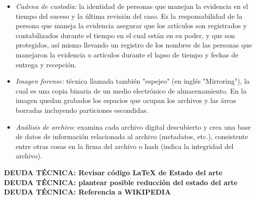 \begin{itemize}
    \item \emph{Cadena de custodia:} la identidad de personas que manejan la evidencia en el tiempo del suceso y la última revisión del caso. Es la responsabilidad de la persona que maneja la evidencia asegurar que los artículos son registrados y contabilizados durante el tiempo en el cual están en su poder, y que son protegidos, así mismo llevando un registro de los nombres de las personas que manejaron la evidencia o artículos durante el lapso de tiempo y fechas de entrega y recepción.
    \item \emph{Imagen forense:} técnica llamada también "espejeo" (en inglés "Mirroring"), la cual es una copia binaria de un medio electrónico de almacenamiento. En la imagen quedan grabados los espacios que ocupan los archivos y las áreas borradas incluyendo particiones escondidas.
    \item \emph{Análisis de archivo:} examina cada archivo digital descubierto y crea una base de datos de información relacionada al archivo (metadatos, etc.), consistente entre otras cosas en la firma del archivo o hash (indica la integridad del archivo).
\end{itemize}

{\color{red}\textbf{DEUDA TÉCNICA: Revisar código LaTeX de Estado del arte}}
{\color{red}\textbf{DEUDA TÉCNICA: plantear posible reducción del estado del arte}}
{\color{red}\textbf{DEUDA TÉCNICA: Referencia a WIKIPEDIA}}